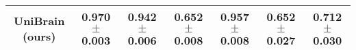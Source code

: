 \begin{table*}[t]
{\begin{tabular}{ccccccc}
    \\

    \midrule
    
    \textbf{UniBrain (ours)} &
    
    \textbf{0.970 $\pm$ 0.003} &
    \textbf{0.942 $\pm$ 0.006} &
    \textbf{0.652 $\pm$ 0.008} &
    \textbf{0.957 $\pm$ 0.008} &
    \textbf{0.652 $\pm$ 0.027} &
    \textbf{0.712 $\pm$ 0.030} 


    \\
    
    \bottomrule  
    
    \end{tabular}}
    \vspace{-10pt}
\end{table*}

